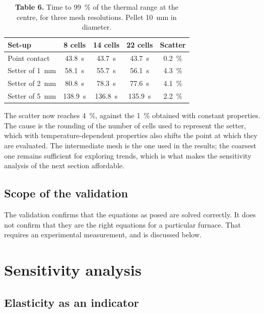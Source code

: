 \documentclass[11pt,a4paper]{article}
\begin{document}
\begin{table}[htbp]
\centering
\caption*{\textcolor{uji}{\textbf{Table 6.}} Time to \SI{99}{\percent} of
the thermal range at the centre, for three mesh resolutions. Pellet
\SI{10}{\milli\meter} in diameter.}
\begin{tabular}{lcccc}
\toprule
Set-up & 8 cells & 14 cells & 22 cells & Scatter \\
\midrule
Point contact                     & \SI{43.8}{\second} & \SI{43.7}{\second} & \SI{43.7}{\second} & \SI{0.2}{\percent} \\
Setter of \SI{1}{\milli\meter}    & \SI{58.1}{\second} & \SI{55.7}{\second} & \SI{56.1}{\second} & \SI{4.3}{\percent} \\
Setter of \SI{2}{\milli\meter}    & \SI{80.8}{\second} & \SI{78.3}{\second} & \SI{77.6}{\second} & \SI{4.1}{\percent} \\
Setter of \SI{5}{\milli\meter}    & \SI{138.9}{\second} & \SI{136.8}{\second} & \SI{135.9}{\second} & \SI{2.2}{\percent} \\
\bottomrule
\end{tabular}
\end{table}

The scatter now reaches \SI{4}{\percent}, against the \SI{1}{\percent}
obtained with constant properties. The cause is the rounding of the number
of cells used to represent the setter, which with temperature-dependent
properties also shifts the point at which they are evaluated. The
intermediate mesh is the one used in the results; the coarsest one remains
sufficient for exploring trends, which is what makes the sensitivity
analysis of the next section affordable.

\subsection{Scope of the validation}

The validation confirms that the equations as posed are solved correctly. It
does not confirm that they are the right equations for a particular
furnace. That requires an experimental measurement, and is discussed below.

\section{Sensitivity analysis}

\subsection{Elasticity as an indicator}
\end{document}
